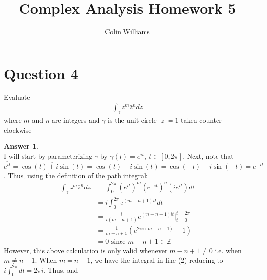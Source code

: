 \documentclass[10pt,a4paper]{article}
\title{Complex Analysis Homework 5}
\author{Colin Williams}
\theoremstyle{definition}
\newtheorem*{answer*}{Answer}
\begin{document}
\maketitle

\section*{Question 4}
Evaluate 
\begin{align*}
\int_{\gamma} z^m \bar{z}^n dz
\end{align*}
where $m$ and $n$ are integers and $\gamma$ is the unit circle $|z| = 1$ taken counter-clockwise

\begin{answer*}{$ $}
\\I will start by parameterizing $\gamma$ by $\gamma(t) = e^{it}, \; t \in [0, 2\pi]$. Next, note that $\overline{e^{it}} = \overline{\cos(t) + i\sin(t)} = \cos(t) - i\sin(t) = \cos(-t) + i\sin(-t) = e^{-it}$. Thus, using the definition of the path integral:
\begin{align}
\int_{\gamma} z^m\overline{z}^n dz &= \int_0^{2\pi} (e^{it})^m(e^{-it})^n(ie^{it})dt\\
&= i\int_0^{2\pi}e^{(m - n + 1)it}dt\\
&= \frac{i}{i(m - n + 1)}e^{(m - n + 1)it} \big|_{t = 0}^{t = 2\pi}\\
&= \frac{1}{m - n + 1}\left(e^{2\pi i(m - n + 1)} - 1\right)\\
&= 0 \text{ since } m - n + 1 \in \mathbb{Z}
\end{align}
However, this above calculation is only valid whenever $m - n + 1 \neq 0$ i.e. when $m \neq n - 1$. When $m = n - 1$, we have the integral in line (2) reducing to $i\int_0^{2\pi} dt = 2\pi i$. Thus,  and 
\end{answer*}
\end{document}
